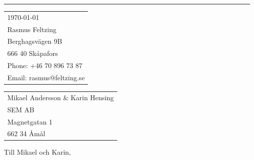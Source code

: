 \documentclass{article}
\begin{document}


\vspace{-1em} %

\rule{\linewidth}{1pt} %

\bigskip\bigskip %


\hfill
\begin{tabular}{l @{}}
	\today \bigskip\\ %
	Rasmus Feltzing \\
	Berghagsvägen 9B \\ %
	666 40 Skåpafors \\
	Phone: +46 70 896 73 87 \\
	Email: rasmus@feltzing.se
\end{tabular}

\bigskip %


\begin{tabular}{@{} l}
  Mikael Andersson \& Karin Hensing \\ 
	SEM AB \\
	Magnetgatan 1 \\
	662 34 Åmål
\end{tabular}

\bigskip %

Till Mikael och Karin,

\bigskip %


\end{document}
